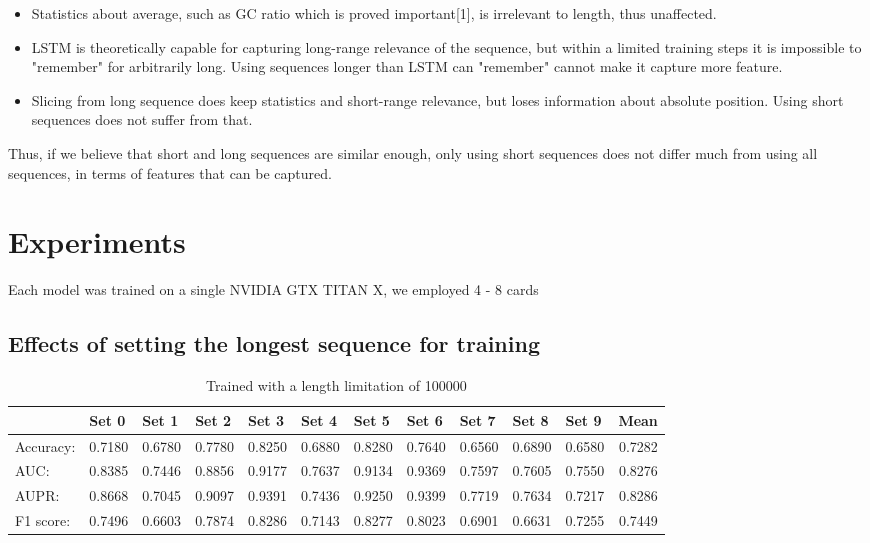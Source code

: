 \documentclass[10pt,a4paper]{article}
\begin{document}
\begin{spacing}{1.5}
\begin{itemize}
\item Statistics about average, such as GC ratio which is proved important[1], is irrelevant to length, thus unaffected.

\item LSTM is theoretically capable for capturing long-range relevance of the sequence, but within a limited training steps it is impossible to "remember" for arbitrarily long. Using sequences longer than LSTM can "remember" cannot make it capture more feature.

\item Slicing from long sequence does keep statistics and short-range relevance, but loses information about absolute position. Using short sequences does not suffer from that.

\end{itemize}

Thus, if we believe that short and long sequences are similar enough, only using short sequences does not differ much from using all sequences, in terms of features that can be captured.

\section{Experiments}

Each model was trained on a single NVIDIA GTX TITAN X, we employed 4 - 8 cards

\subsection{Effects of setting the longest sequence for training}

\begin{table}[H]
	\centering
	\caption{Trained with a length limitation of 100000}
	\begin{tabular}{l|rrrrrrrrrr|r}
		& \multicolumn{1}{l}{Set 0} & \multicolumn{1}{l}{Set 1} & \multicolumn{1}{l}{Set 2} & \multicolumn{1}{l}{Set 3} & \multicolumn{1}{l}{Set 4} & \multicolumn{1}{l}{Set 5} & \multicolumn{1}{l}{Set 6} & \multicolumn{1}{l}{Set 7} & \multicolumn{1}{l}{Set 8} & \multicolumn{1}{l}{Set 9} & \multicolumn{1}{l}{Mean} \\ \hline \hline
		Accuracy: & 0.7180  & 0.6780  & 0.7780  & 0.8250  & 0.6880  & 0.8280  & 0.7640  & 0.6560  & 0.6890  & 0.6580  & 0.7282  \\
		AUC:  & 0.8385  & 0.7446  & 0.8856  & 0.9177  & 0.7637  & 0.9134  & 0.9369  & 0.7597  & 0.7605  & 0.7550  & 0.8276  \\
		AUPR: & 0.8668  & 0.7045  & 0.9097  & 0.9391  & 0.7436  & 0.9250  & 0.9399  & 0.7719  & 0.7634  & 0.7217  & 0.8286  \\
		F1 score: & 0.7496  & 0.6603  & 0.7874  & 0.8286  & 0.7143  & 0.8277  & 0.8023  & 0.6901  & 0.6631  & 0.7255  & 0.7449  \\
	\end{tabular}%
	\label{tab:addlabel}%
\end{table}%


\end{spacing}
\end{document}
